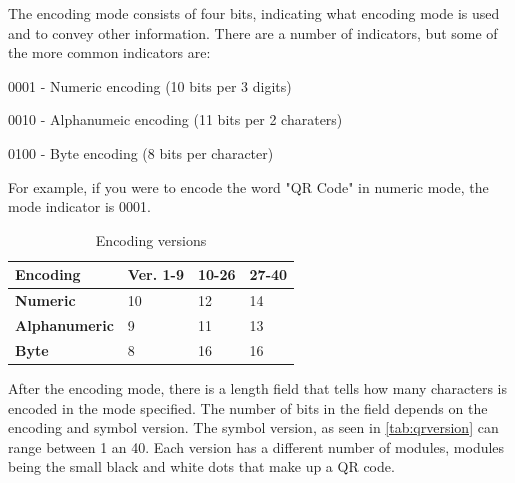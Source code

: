 The encoding mode consists of four bits, indicating what encoding mode is used and to convey other information. There are a number of indicators, but some of the more common indicators are:

\begin{description}
\item 0001 - Numeric encoding (10 bits per 3 digits)
\item 0010 - Alphanumeic encoding (11 bits per 2 charaters)
\item 0100 - Byte encoding (8 bits per character)
\end{description}

For example, if you were to encode the word "QR Code" in numeric mode, the mode indicator is 0001.

\begin{table}[H]
\centering
\begin{tabular}{|l|l|l|l|}
\hline
\textbf{Encoding} & \textbf{Ver. 1-9} & \textbf{10-26} & \textbf{27-40} \\
\hline
\textbf{Numeric } & 10 & 12 & 14  \\
\hline
\textbf{Alphanumeric} & 9 & 11 & 13 \\
\hline
\textbf{Byte} & 8 & 16 & 16 \\
\hline
\end{tabular}
\caption{Encoding versions}
\label{tab:qrversion}
\end{table}

After the encoding mode, there is a length field that tells how many characters is encoded in the mode specified. The number of bits in the field depends on the encoding and symbol version\citep{qrcode1}. The symbol version, as seen in \autoref{tab:qrversion} can range between 1 an 40. Each version has a different number of modules, modules being the small black and white dots that make up a QR code\citep{qrversion}. 



